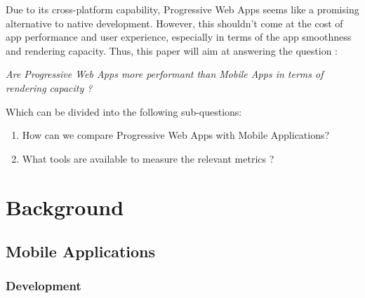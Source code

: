 Due to its cross-platform capability, Progressive Web Apps seems like a promising alternative to native development. However, this shouldn't come at the cost of app performance and user experience, especially in terms of the app smoothness and rendering capacity.
Thus, this paper will aim at answering the question : 
\begin{center}
    \textit{Are Progressive Web Apps more performant than Mobile Apps in terms of rendering capacity ?}
\end{center}
Which can be divided into the following sub-questions: 
\begin{enumerate}
    \item How can we compare Progressive Web Apps with Mobile Applications?
    \item What tools are available to measure the relevant metrics ?
\end{enumerate}

\chapter{Background}

\section{Mobile Applications}
\subsection{Development}

